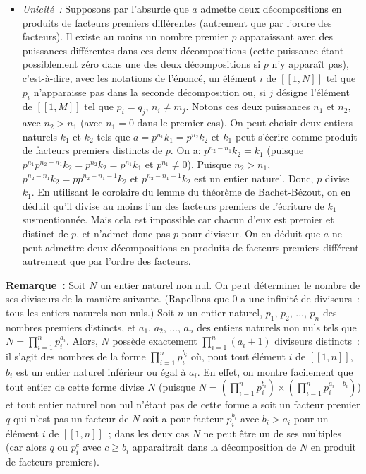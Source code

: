 \begin{itemize}
    \item \textit{Unicité :} 
        Supposons par l'absurde que $a$ admette deux décompositions en produits de facteurs premiers différentes (autrement que par l'ordre des facteurs). 
        Il existe au moins un nombre premier $p$ apparaissant avec des puissances différentes dans ces deux décompositions (cette puissance étant possiblement zéro dans une des deux décompositions si $p$ n'y apparaît pas), c'est-à-dire, avec les notations de l'énoncé, un élément $i$ de $[\![1,N]\!]$ tel que $p_i$ n'apparaisse pas dans la seconde décomposition ou, si $j$ désigne l'élément de $[\![1,M]\!]$ tel que $p_i = q_j$, $n_i \neq m_j$. 
        Notons ces deux puissances $n_1$ et $n_2$, avec $n_2 > n_1$ (avec $n_1 = 0$ dans le premier cas). 
        On peut choisir deux entiers naturels $k_1$ et $k_2$ tels que $a = p^{n_1} k_1 = p^{n_2} k_2$ et $k_1$ peut s'écrire comme produit de facteurs premiers distincts de $p$. 
        On a: $p^{n_2 - n_1} k_2 = k_1$ (puisque $p^{n_1} p^{n_2 - n_1} k_2 = p^{n_2} k_2 = p^{n_1} k_1$ et $p^{n_1} \neq 0$). 
        Puisque $n_2 > n_1$, $p^{n_2 - n_1} k_2 = p p^{n_2 - n_1 - 1} k_2$ et $p^{n_2 - n_1 - 1} k_2$ est un entier naturel.
        Donc, $p$ divise $k_1$. 
        En utilisant le corolaire du lemme du théorème de Bachet-Bézout, on en déduit qu'il divise au moins l'un des facteurs premiers de l'écriture de $k_1$ susmentionnée. 
        Mais cela est impossible car chacun d'eux est premier et distinct de $p$, et n'admet donc pas $p$ pour diviseur.
    On en déduit que $a$ ne peut admettre deux décompositions en produits de facteurs premiers différent autrement que par l'ordre des facteurs.
\end{itemize}

\done

\medskip

\noindent\textbf{Remarque :} Soit $N$ un entier naturel non nul. 
    On peut déterminer le nombre de ses diviseurs de la manière suivante. 
    (Rapellons que $0$ a une infinité de diviseurs : tous les entiers naturels non nuls.) 
    Soit $n$ un entier naturel, $p_1$, $p_2$, ..., $p_n$ des nombres premiers distincts, et $a_1$, $a_2$, ..., $a_n$ des entiers naturels non nuls tels que $N = \prod_{i=1}^n p_i^{a_i}$. 
    Alors, $N$ possède exactement $\prod_{i=1}^n (a_i+1)$ diviseurs distincts : il s'agit des nombres de la forme $\prod_{i=1}^n p_i^{b_i}$ où, pout tout élément $i$ de $[\![1,n]\!]$, $b_i$ est un entier naturel inférieur ou égal à $a_i$. 
    En effet, on montre facilement que tout entier de cette forme divise $N$ (puisque $N = \left( \prod_{i=1}^n p_i^{b_i} \right) \times \left( \prod_{i=1}^n p_i^{a_i-b_i} \right)$) et tout entier naturel non nul n'étant pas de cette forme a soit un facteur premier $q$ qui n'est pas un facteur de $N$ soit a pour facteur $p_i^{b_i}$ avec $b_i > a_i$ pour un élément $i$ de $[\![1,n]\!]$ ; dans les deux cas $N$ ne peut être un de ses multiples (car alors $q$ ou $p_i^c$ avec $c \geq b_i$ apparaitrait dans la décomposition de $N$ en produit de facteurs premiers).

